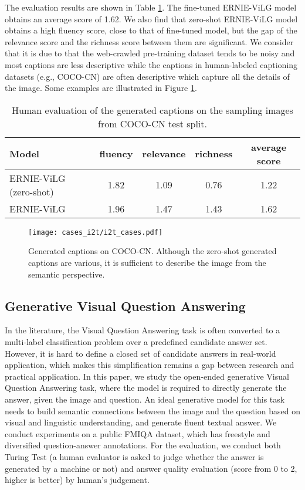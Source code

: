 \documentclass{article}
\begin{document}
The evaluation results are shown in Table \ref{exp-zero-i2t-human-cococn-result}. The fine-tuned ERNIE-ViLG model obtains an average score of 1.62. We also find that zero-shot ERNIE-ViLG model obtains a high fluency score, close to that of fine-tuned model, but the gap of the relevance score and the richness score between them are significant. We consider that it is due to that the web-crawled pre-training dataset tends to be noisy and most captions are less descriptive while the captions in human-labeled captioning datasets (e.g., COCO-CN) are often descriptive which capture all the details of the image. Some examples are illustrated in Figure \ref{fig:i2t_cases}.

\begin{table}[htb]
  \caption{Human evaluation of the generated captions on the sampling images from COCO-CN test split. }
  \begin{tabular}{l|ccc|c}
    \toprule
    Model    & fluency & relevance & richness & average score\\
    \midrule
    ERNIE-ViLG (zero-shot) & 1.82 & 1.09 & 0.76 & 1.22 \\
    ERNIE-ViLG & 1.96 & 1.47 & 1.43 & 1.62\\
    \bottomrule
  \end{tabular}
  \label{exp-zero-i2t-human-cococn-result}
  \centering
\end{table}

\begin{figure}[htb]
    \centering
    \texttt{[image: cases\_i2t/i2t\_cases.pdf]}
    \caption{Generated captions on COCO-CN. Although the zero-shot generated captions are various, it is sufficient to describe the image from the semantic perspective.}
    \label{fig:i2t_cases}
\end{figure}


\subsection{Generative Visual Question Answering}
In the literature, the Visual Question Answering task is often converted to a multi-label classification problem over a predefined candidate answer set. However, it is hard to define a closed set of candidate answers in real-world application, which makes this simplification remains a gap between research and practical application. In this paper, we study the open-ended generative Visual Question Answering task, where the model is required to directly generate the answer, given the image and question. An ideal generative model for this task needs to build semantic connections between the image and the question based on visual and linguistic understanding, and generate fluent textual answer. We conduct experiments on a public FMIQA \cite{gao2015fmiqa} dataset, which has freestyle and diversified question-answer annotations. For the evaluation, we conduct both Turing Test \cite{gao2015fmiqa} (a human evaluator is asked to judge whether the answer is generated by a machine or not) and answer quality evaluation (score from 0 to 2, higher is better) by human's judgement. 
\end{document}
